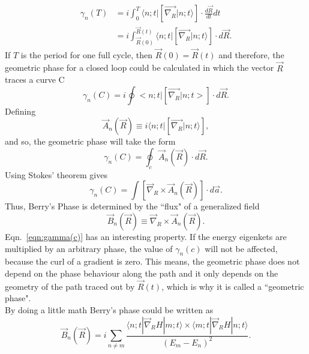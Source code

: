 \begin{equation}
\begin{split}
\gamma_n(T) &=i\int_0^T \langle n;t|\left[\vec{\nabla_R}|n;t \rangle \right]\cdot\frac{d\vec{R}}{dt} dt \\
&= i \int_{\vec{R}(0)} ^{\vec{R}(t)}  \langle n;t|\left[\vec{\nabla_R}|n;t\rangle\right]\cdot d\vec{R} .
\end{split}
\end{equation}
%
If $T$ is the period for one full cycle, then $\vec{R}(0)=\vec{R}(t)$
and therefore, the geometric phase for a closed loop could be calculated
in which the vector $\vec{R}$ traces a curve C
%
\begin{equation}
\gamma_n(C)=i \oint <n;t| \left[ \vec{\nabla_R} |n;t>\right] \cdot d\vec{R}.
\end{equation}
%
Defining
%
\begin{equation}
\vec{A}_n(\vec{R})\equiv i \langle n;t| \left[ \vec{\nabla_R} |n;t \rangle \right],
\end{equation}
and so, the geometric phase will take the form
%
\begin{equation}
\label{eqn:gamma(c)}
\gamma_n(C)=\oint_c \vec{A}_n(\vec{R}) \cdot d\vec{R}  .
\end{equation}
%
Using Stokes' theorem gives
%
\begin{equation}
\gamma_n(C)= \int \left[ \vec{\nabla}_R \times \vec{A}_n(\vec{R}) \right]  \cdot d\vec{a} .
\end{equation}
Thus, Berry's Phase is determined by the ``flux" of a generalized field
%
\begin{equation}
\vec{B}_n(\vec{R}) \equiv \vec{\nabla}_R \times \vec{A}_n(\vec{R}) .
\end{equation}
%
Eqn.~\ref{eqn:gamma(c)} has an interesting property. If the energy
eigenkets are multiplied by an arbitrary phase, the value of
$\gamma_n(c)$ will not be affected, because the curl of a gradient is
zero. This means, the geometric phase does not depend on the phase
behaviour along the path and it only depends on the geometry of the
path traced out by $\vec{R}(t)$, which is why it is called a
``geometric phase".
\\
By doing a little math Berry's phase could be written as
%
\begin{equation}
\vec{B}_n(\vec{R}) = i \sum_{n \neq m} \frac{ \langle n;t| \vec{\nabla}_R H |m;t \rangle \times  \langle m;t| \vec{\nabla}_R H |n;t \rangle }{(E_m-E_n)^2}.
\end{equation}


